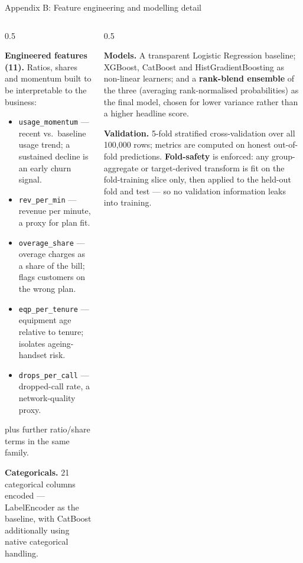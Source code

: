 \documentclass[aspectratio=169]{beamer}
\begin{document}
\begin{frame}{Appendix B: Feature engineering and modelling detail}
    \begin{columns}[T]
    \begin{column}{0.5\textwidth}
        {\fontsize{5}{6}\selectfont
        \textbf{Engineered features (11).} Ratios, shares and momentum built to
        be interpretable to the business:
        \begin{itemize}
            \item \texttt{usage\_momentum} --- recent vs.\ baseline usage trend;
                  a sustained decline is an early churn signal.
            \item \texttt{rev\_per\_min} --- revenue per minute, a proxy for
                  plan fit.
            \item \texttt{overage\_share} --- overage charges as a share of the
                  bill; flags customers on the wrong plan.
            \item \texttt{eqp\_per\_tenure} --- equipment age relative to
                  tenure; isolates ageing-handset risk.
            \item \texttt{drops\_per\_call} --- dropped-call rate, a
                  network-quality proxy.
        \end{itemize}
        plus further ratio/share terms in the same family.

        \medskip
        \textbf{Categoricals.} 21 categorical columns encoded --- LabelEncoder as
        the baseline, with CatBoost additionally using native categorical
        handling.
        \par}
    \end{column}
    \begin{column}{0.5\textwidth}
        {\fontsize{5}{6}\selectfont
        \textbf{Models.} A transparent Logistic Regression baseline; XGBoost,
        CatBoost and HistGradientBoosting as non-linear learners; and a
        \textbf{rank-blend ensemble} of the three (averaging rank-normalised
        probabilities) as the final model, chosen for lower variance rather than
        a higher headline score.

        \medskip
        \textbf{Validation.} 5-fold stratified cross-validation over all 100{,}000
        rows; metrics are computed on honest out-of-fold predictions.
        \textbf{Fold-safety} is enforced: any group-aggregate or target-derived
        transform is fit on the fold-training slice only, then applied to the
        held-out fold and test --- so no validation information leaks into
        training.

}
\end{column}
\end{columns}
\end{frame}
\end{document}
